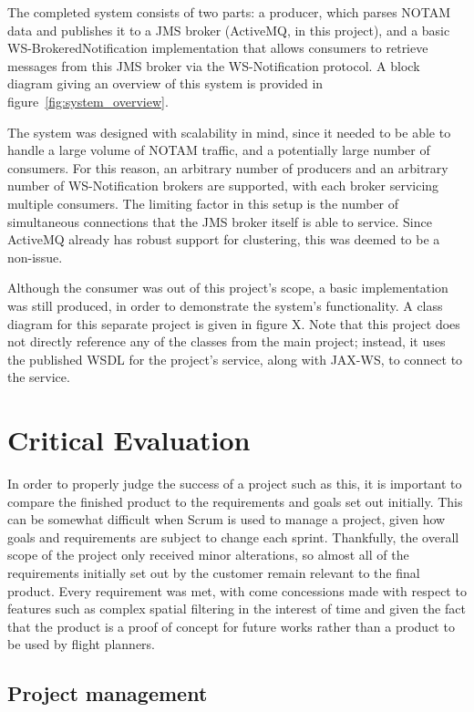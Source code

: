 \documentclass[a4paper, 12pt, twoside]{article}
\begin{document}
The completed system consists of two parts: a producer, which parses NOTAM data and publishes it to a JMS broker (ActiveMQ, in this project), and a basic WS-BrokeredNotification implementation that allows consumers to retrieve messages from this JMS broker via the WS-Notification protocol. A block diagram giving an overview of this system is provided in figure~\ref{fig:system_overview}.

The system was designed with scalability in mind, since it needed to be able to handle a large volume of NOTAM traffic, and a potentially large number of consumers. For this reason, an arbitrary number of producers and an arbitrary number of WS-Notification brokers are supported, with each broker servicing multiple consumers. The limiting factor in this setup is the number of simultaneous connections that the JMS broker itself is able to service. Since ActiveMQ already has robust support for clustering, this was deemed to be a non-issue.

Although the consumer was out of this project's scope, a basic implementation was still produced, in order to demonstrate the system's functionality. A class diagram for this separate project is given in figure X. Note that this project does not directly reference any of the classes from the main project; instead, it uses the published WSDL for the project's service, along with JAX-WS, to connect to the service.

\section{Critical Evaluation}
\label{sec:critical_evaluation}

In order to properly judge the success of a project such as this, it is important to compare the finished product to the requirements and goals set out initially. This can be somewhat difficult when Scrum is used to manage a project, given how goals and requirements are subject to change each sprint. Thankfully, the overall scope of the project only received minor alterations, so almost all of the requirements initially set out by the customer remain relevant to the final product. Every requirement was met, with come concessions made with respect to features such as complex spatial filtering in the interest of time and given the fact that the product is a proof of concept for future works rather than a product to be used by flight planners.

\subsection{Project management}
\label{sec:eval_project_management}
\end{document}
